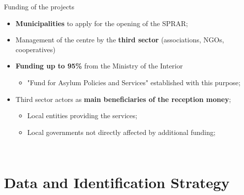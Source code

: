 \documentclass[xcolor={dvipsnames}]{beamer}
\begin{document}
\begin{frame}{Funding of the projects}

\vspace{5}

\begin{itemize}
\justifying
    \item \textbf{Municipalities} to apply for the opening of the SPRAR; \\
    \vspace{5}
    
    \item Management of the centre by the \textbf{third sector} (associations, NGOs, cooperatives) \\
    \vspace{5}
    
    \item \textbf{Funding up to 95\%} from the Ministry of the Interior \\
    \vspace{5}
    \begin{itemize}
        \item "Fund for Asylum Policies and Services" established with this purpose;
    \end{itemize}
    
    \item Third sector actors as \textbf{main beneficiaries of the reception money}; \\
    \vspace{5}
    \begin{itemize}
        \item Local entities providing the services;
        \item Local governments not directly affected by additional funding;
    \end{itemize}
    
    
\end{itemize}
\\

\vspace{10}
\footnotesize
\citep{ricardguay2019}
\end{frame}



\section{Data and Identification Strategy}
\end{document}
